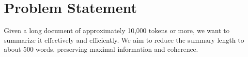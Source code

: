 \section{Problem Statement}
\label{sec:problem}

Given a long document of approximately 10,000 tokens or more, we want to summarize it
effectively and efficiently.
We aim to reduce the summary length to about 500 words, preserving maximal information
and coherence.
